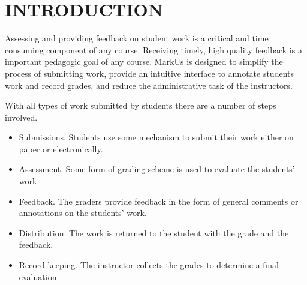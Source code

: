 \documentclass[twocolumn,10pt]{asme2e}
\begin{document}


\section*{INTRODUCTION}


Assessing and providing feedback on student work is a critical and time consuming component of any course. Receiving timely, high quality feedback is a important pedagogic goal of any course. MarkUs is designed to simplify the process of submitting work, provide an intuitive interface to annotate students work and record grades, and reduce the administrative task of the instructors. 

With all types of work submitted by students there are a number of steps involved.

\begin{itemize}
        \item Submissions. Students use some mechanism to submit their work either on paper or electronically.
        \item Assessment.  Some form of grading scheme is used to evaluate the students' work.
        \item Feedback. The graders provide feedback in the form of general comments or annotations on the students' work.
        \item Distribution. The work is returned to the student with the grade and the feedback.
        \item Record keeping. The instructor collects the grades to determine a final evaluation.
\end{itemize}
\end{document}
